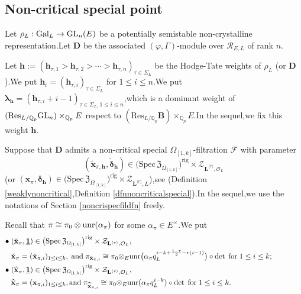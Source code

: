 \documentclass[SecEq,CM,GP]{degruyter-crelle} %
\theoremstyle{plain}
\newcommand{\bmdel}{{ \bm{\delta}_\bh}}
\newcommand{\Dpik}{{\mathbf{D}}}
\newcommand{\defvar}{{ X_{\omepik,\mathbf{{h}}}(\overline{r})}}
\newcommand{\gal}{{\rm Gal}}
\newcommand{\GLN}{{\rm GL}}
\newcommand{\hpi}{{{\mathbf{h}}}}
\newcommand{\lrr}{{\langle r\rangle}}
\newcommand{\omepik}{\Omega_{[1,k]}}
\newcommand{\rigch}{{\mathcal{Z}_{\bL^{\lrr},\mathcal{O}_L}}}
\newcommand{\rigchl}{{\mathcal{Z}_{\bL^{\lrr},L}}}
\newcommand{\rigerchl}{{\mathcal{Z}_{\bL_{\ul{n}},L}}}
\newcommand{\sbanpik}{{\big(\mathrm{Spec}\hspace{2pt}\mathfrak{Z}_{\omepik}\big)^{\mathrm{rig}}}}
\newcommand{\te}{{\otimes_E}}
\newcommand{\unr}{{\rm unr}}
\newcommand{\ul}{\underline}
\newcommand{\BQ}{{\mathbb{Q}}}
\newcommand{\bB}{{\mathbf{B}}}
\newcommand{\bL}{{\mathbf{L}}}
\newcommand{\bx}{{\mathbf{x}}}
\newcommand{\bh}{{\mathbf{h}}}
\newcommand{\cR}{\mathcal R}
\newcommand{\cF}{\mathcal F}
\begin{document}


\subsection{Non-critical special point}\label{appearpoint}

Let  $\rho_L:\gal_L\rightarrow \GLN_{n}(E)$ be a potentially semistable non-crystalline representation.\;Let $\Dpik$ be the associated  
$(\varphi,\Gamma)$-module over $\cR_{E,L}$ of rank $n$.\;

Let  $\bh:=(\hpi_{\tau,1}>\hpi_{\tau,2}>\cdots>\hpi_{\tau,n} )_{\tau\in \Sigma_L}$ be the Hodge-Tate weights of $\rho_L$ (or $\Dpik$).\;We put $\hpi_{i}=(\hpi_{\tau,i})_{\tau\in \Sigma_L}$ for $1\leq i\leq n$.\;We put ${\bm\lambda}_\bh=(\hpi_{\tau,i}+i-1)_{\tau\in \Sigma_L,1\leq i\leq n}$,\;which is a dominant weight of $(\mathrm{Res}_{L/\BQ_p}\GLN_n)\times_{\BQ_p}E$ respect to $(\mathrm{Res}_{L/\BQ_p}\bB)\times_{\BQ_p}E$.\;In the sequel,\;we fix this weight $\bh$.\;

Suppose that $\Dpik$ admits a non-critical special  $\omepik$-filtration $\cF$ with parameter $$(\widetilde{\bx}_{\pi,\bh},\widetilde{\bm{\delta}}_\bh)\in \sbanpik\times\rigch $$ (or $(\bx_{\pi},\bmdel)\in \sbanpik\times\rigchl $),\;see (Definition \ref{weaklynoncritical},\;Definition \ref{dfnnoncriticalspecial}).\;In the sequel,\;we use the notations of Section \ref{noncrispecfildfn} freely.\;

Recall that $\pi\cong \pi_0\otimes\unr(\alpha_\pi )$ for some $\alpha_\pi \in E^\times$.\;We put 
\begin{equation}
\begin{aligned}
	\bullet\;	&(\breve{\mathbf{{x}}}_\pi,\underline{\mathbf{1}})\in \sbanpik\times\rigch,\\
	&\breve{\mathbf{{x}}}_\pi=(\breve{\mathbf{{x}}}_{\pi,i})_{1\leq i\leq k},\;\text{and\;}\pi_{\breve{\mathbf{{x}}}_{\pi,i}}\cong \pi_0\te\unr\big(\alpha_\pi q_L^{i-k+\frac{1-r}{2}-r(i-1)}\big)\circ\det \text{\;for\;}  1\leq i\leq k;\hspace{40pt}\\
	\bullet\;	&(\widehat{\bx}_\pi,\underline{\mathbf{1}})\in \sbanpik\times\rigch,\\
	&\widehat{\bx}_\pi=(\bx_{\pi,i})_{1\leq i\leq k},\text{and\;}\pi_{\widehat{\bx}_{\pi,i}}\cong \pi_0\te\unr(\alpha_\pi q_L^{i-k})\circ\det \text{\;for\;}  1\leq i\leq k.\;
\end{aligned}
\end{equation}
\end{document}
